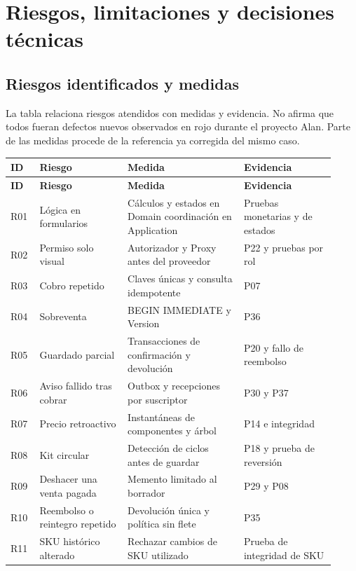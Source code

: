 
\section{Riesgos, limitaciones y decisiones técnicas}
\subsection{Riesgos identificados y medidas}
La tabla relaciona riesgos atendidos con medidas y evidencia. No afirma que todos fueran defectos nuevos observados en rojo durante el proyecto Alan. Parte de las medidas procede de la referencia ya corregida del mismo caso.
\begingroup\small
\begin{longtable}{@{}>{\raggedright\arraybackslash}p{0.08\linewidth}>{\raggedright\arraybackslash}p{0.25\linewidth}>{\raggedright\arraybackslash}p{0.33\linewidth}>{\raggedright\arraybackslash}p{0.26\linewidth}@{}}
\toprule
\textbf{ID} & \textbf{Riesgo} & \textbf{Medida} & \textbf{Evidencia}\\
\midrule
\endfirsthead
\toprule
\textbf{ID} & \textbf{Riesgo} & \textbf{Medida} & \textbf{Evidencia}\\
\midrule
\endhead
R01 & Lógica en formularios & Cálculos y estados en Domain coordinación en Application & Pruebas monetarias y de estados\\[3pt]
R02 & Permiso solo visual & Autorizador y Proxy antes del proveedor & P22 y pruebas por rol\\[3pt]
R03 & Cobro repetido & Claves únicas y consulta idempotente & P07\\[3pt]
R04 & Sobreventa & BEGIN IMMEDIATE y Version & P36\\[3pt]
R05 & Guardado parcial & Transacciones de confirmación y devolución & P20 y fallo de reembolso\\[3pt]
R06 & Aviso fallido tras cobrar & Outbox y recepciones por suscriptor & P30 y P37\\[3pt]
R07 & Precio retroactivo & Instantáneas de componentes y árbol & P14 e integridad\\[3pt]
R08 & Kit circular & Detección de ciclos antes de guardar & P18 y prueba de reversión\\[3pt]
R09 & Deshacer una venta pagada & Memento limitado al borrador & P29 y P08\\[3pt]
R10 & Reembolso o reintegro repetido & Devolución única y política sin flete & P35\\[3pt]
R11 & SKU histórico alterado & Rechazar cambios de SKU utilizado & Prueba de integridad de SKU\\[3pt]

\end{longtable}
